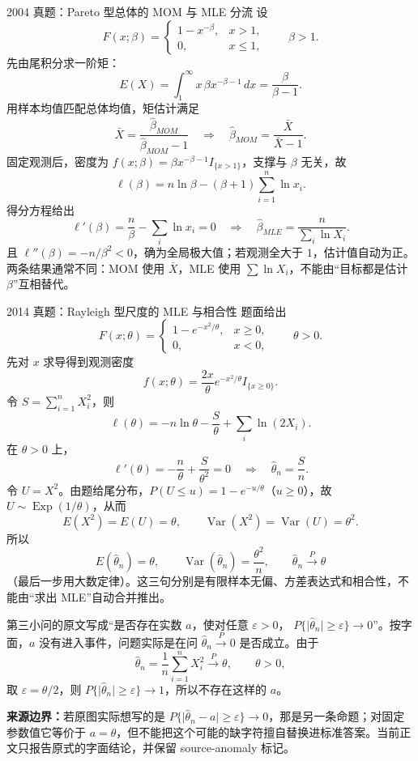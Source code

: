 \documentclass[11pt,a4paper]{ctexart}
\begin{document}
\begin{examplebox}{2004 真题：Pareto 型总体的 MOM 与 MLE 分流}
设
\[
F(x;\beta)=\begin{cases}1-x^{-\beta},&x>1,\\0,&x\le1,\end{cases}
\qquad \beta>1.
\]
先由尾积分求一阶矩：
\[
E(X)=\int_1^\infty x\,\beta x^{-\beta-1}\,dx
=\frac{\beta}{\beta-1}.
\]
用样本均值匹配总体均值，矩估计满足
\[
\bar X=\frac{\widehat\beta_{MOM}}{\widehat\beta_{MOM}-1}
\quad\Longrightarrow\quad
\widehat\beta_{MOM}=\frac{\bar X}{\bar X-1}.
\]
固定观测后，密度为 $f(x;\beta)=\beta x^{-\beta-1}I_{\{x>1\}}$，支撑与 $\beta$ 无关，故
\[
\ell(\beta)=n\ln\beta-(\beta+1)\sum_{i=1}^n\ln x_i.
\]
得分方程给出
\[
\ell'(\beta)=\frac n\beta-\sum_i\ln x_i=0
\quad\Longrightarrow\quad
\widehat\beta_{MLE}=\frac n{\sum_i\ln X_i}.
\]
且 $\ell''(\beta)=-n/\beta^2<0$，确为全局极大值；若观测全大于 $1$，估计值自动为正。两条结果通常不同：MOM 使用 $\bar X$，MLE 使用 $\sum\ln X_i$，不能由“目标都是估计 $\beta$”互相替代。
\end{examplebox}

\begin{examplebox}{2014 真题：Rayleigh 型尺度的 MLE 与相合性}
题面给出
\[
F(x;\theta)=\begin{cases}1-e^{-x^2/\theta},&x\ge0,\\0,&x<0,\end{cases}
\qquad \theta>0.
\]
先对 $x$ 求导得到观测密度
\[
f(x;\theta)=\frac{2x}{\theta}e^{-x^2/\theta}I_{\{x\ge0\}}.
\]
令 $S=\sum_{i=1}^nX_i^2$，则
\[
\ell(\theta)=-n\ln\theta-\frac{S}{\theta}+\sum_i\ln(2X_i).
\]
在 $\theta>0$ 上，
\[
\ell'(\theta)=-\frac n\theta+\frac S{\theta^2}=0
\quad\Longrightarrow\quad
\widehat\theta_n=\frac Sn.
\]
令 $U=X^2$。由题给尾分布，$P(U\le u)=1-e^{-u/\theta}$（$u\ge0$），故
$U\sim\operatorname{Exp}(1/\theta)$，从而
\[
E(X^2)=E(U)=\theta,\qquad \operatorname{Var}(X^2)=\operatorname{Var}(U)=\theta^2.
\]
所以
\[
E(\widehat\theta_n)=\theta,\qquad
\operatorname{Var}(\widehat\theta_n)=\frac{\theta^2}{n},
\qquad \widehat\theta_n\xrightarrow{P}\theta
\]
（最后一步用大数定律）。这三句分别是有限样本无偏、方差表达式和相合性，不能由“求出 MLE”自动合并推出。

第三小问的原文写成“是否存在实数 $a$，使对任意 $\varepsilon>0$，
$P\{\lvert\widehat\theta_n\rvert\ge\varepsilon\}\to0$”。按字面，$a$ 没有进入事件，问题实际是在问 $\widehat\theta_n\xrightarrow{P}0$ 是否成立。由于
\[
\widehat\theta_n=\frac1n\sum_{i=1}^nX_i^2\xrightarrow{P}\theta,
\qquad \theta>0,
\]
取 $\varepsilon=\theta/2$，则 $P\{\lvert\widehat\theta_n\rvert\ge\varepsilon\}\to1$，所以不存在这样的 $a$。

\textbf{来源边界：}若原图实际想写的是 $P\{\lvert\widehat\theta_n-a\rvert\ge\varepsilon\}\to0$，那是另一条命题；对固定参数值它等价于 $a=\theta$，但不能把这个可能的缺字符擅自替换进标准答案。当前正文只报告原式的字面结论，并保留 source-anomaly 标记。
\end{examplebox}
\end{document}
